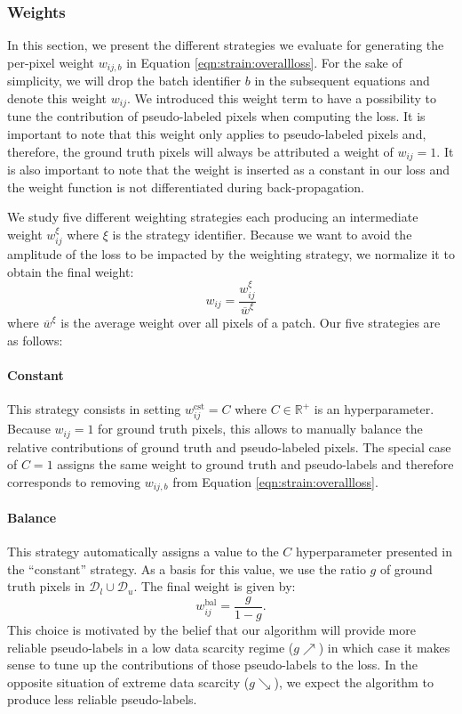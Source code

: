 \subsubsection{Weights}
\label{sssec:strain:weights}
In this section, we present the different strategies we evaluate for generating the per-pixel weight $w_{ij,b}$ in Equation \ref{eqn:strain:overallloss}. For the sake of simplicity, we will drop the batch identifier $b$ in the subsequent equations and denote this weight $w_{ij}$. We introduced this weight term to have a possibility to tune the contribution of pseudo-labeled pixels when computing the loss. It is important to note that this weight only applies to pseudo-labeled pixels and, therefore, the ground truth pixels will always be attributed a weight of $w_{ij} = 1$. It is also important to note that the weight is inserted as a constant in our loss and the weight function is not differentiated during back-propagation. 

We study five different weighting strategies each producing an intermediate weight $w^{\xi}_{ij}$ where $\xi$ is the strategy identifier. Because we want to avoid the amplitude of the loss to be impacted by the weighting strategy, we normalize it to obtain the final weight:
\begin{equation}
w_{ij} = \dfrac{w^{\xi}_{ij}}{\overline{w}^{\xi}}
\end{equation}
where $\overline{w}^{\xi}$ is the average weight over all pixels of a patch. Our five strategies are as follows:

\paragraph{Constant} This strategy consists in setting $w^{\text{cst}}_{ij} = C$ where $C \in \mathbb{R}^+$ is an hyperparameter. Because $w_{ij} = 1$ for ground truth pixels, this allows to manually balance the relative contributions of ground truth and pseudo-labeled pixels. The special case of $C = 1$ assigns the same weight to ground truth and pseudo-labels and therefore corresponds to removing $w_{ij,b}$ from Equation \ref{eqn:strain:overallloss}.

\paragraph{Balance} This strategy automatically assigns a value to the $C$ hyperparameter presented in the ``constant'' strategy. As a basis for this value, we use the ratio $g$ of ground truth pixels in $\mathcal{D}_l \cup \mathcal{D}_u$. The final weight is given by: 
\begin{equation}
w^{\text{bal}}_{ij} = \frac{g}{1 - g}.
\label{eqn:strain:balancegt}
\end{equation}
This choice is motivated by the belief that our algorithm will provide more reliable pseudo-labels in a low data scarcity regime ($g \nearrow $) in which case it makes sense to tune up the contributions of those pseudo-labels to the loss. In the opposite situation of extreme data scarcity ($g \searrow $), we expect the algorithm to produce less reliable pseudo-labels. 

